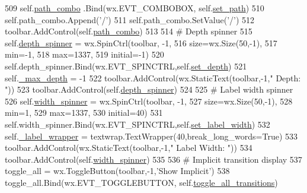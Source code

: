 \begin{DoxyCode}
509         self.\hyperlink{classsmacc__viewer_1_1SmaccViewerFrame_a2b2ee042e4a0d11372e1d12c1925a286}{path\_combo} .Bind(wx.EVT\_COMBOBOX, self.\hyperlink{classsmacc__viewer_1_1SmaccViewerFrame_a4b253c9dc94a475f795644f8a10301c3}{set\_path})
510         self.path\_combo.Append(\textcolor{stringliteral}{'/'})
511         self.path\_combo.SetValue(\textcolor{stringliteral}{'/'})
512         toolbar.AddControl(self.\hyperlink{classsmacc__viewer_1_1SmaccViewerFrame_a2b2ee042e4a0d11372e1d12c1925a286}{path\_combo})
513 
514         \textcolor{comment}{# Depth spinner}
515         self.\hyperlink{classsmacc__viewer_1_1SmaccViewerFrame_abb2756c3503845a85a64c99a7479af63}{depth\_spinner} = wx.SpinCtrl(toolbar, -1,
516                 size=wx.Size(50,-1),
517                 min=-1,
518                 max=1337,
519                 initial=-1)
520         self.depth\_spinner.Bind(wx.EVT\_SPINCTRL,self.\hyperlink{classsmacc__viewer_1_1SmaccViewerFrame_abef01aa41e1f8fe1c74ee942ec44d7ea}{set\_depth})
521         self.\hyperlink{classsmacc__viewer_1_1SmaccViewerFrame_acf8a98a2a2d4ae1f21e0fc3cd020b89a}{\_max\_depth} = -1
522         toolbar.AddControl(wx.StaticText(toolbar,-1,\textcolor{stringliteral}{"    Depth: "}))
523         toolbar.AddControl(self.\hyperlink{classsmacc__viewer_1_1SmaccViewerFrame_abb2756c3503845a85a64c99a7479af63}{depth\_spinner})
524 
525         \textcolor{comment}{# Label width spinner}
526         self.\hyperlink{classsmacc__viewer_1_1SmaccViewerFrame_a9e092051eb4c76d6721dcea6c5c48cde}{width\_spinner} = wx.SpinCtrl(toolbar, -1,
527                 size=wx.Size(50,-1),
528                 min=1,
529                 max=1337,
530                 initial=40)
531         self.width\_spinner.Bind(wx.EVT\_SPINCTRL,self.\hyperlink{classsmacc__viewer_1_1SmaccViewerFrame_afa97fe84879ff60867cc61a80f9fb6f7}{set\_label\_width})
532         self.\hyperlink{classsmacc__viewer_1_1SmaccViewerFrame_a839af1f1021fa7e47ccdfd63d2c56406}{\_label\_wrapper} = textwrap.TextWrapper(40,break\_long\_words=\textcolor{keyword}{True})
533         toolbar.AddControl(wx.StaticText(toolbar,-1,\textcolor{stringliteral}{"    Label Width: "}))
534         toolbar.AddControl(self.\hyperlink{classsmacc__viewer_1_1SmaccViewerFrame_a9e092051eb4c76d6721dcea6c5c48cde}{width\_spinner})
535 
536         \textcolor{comment}{# Implicit transition display}
537         toggle\_all = wx.ToggleButton(toolbar,-1,\textcolor{stringliteral}{'Show Implicit'})
538         toggle\_all.Bind(wx.EVT\_TOGGLEBUTTON, self.\hyperlink{classsmacc__viewer_1_1SmaccViewerFrame_a4c7e69bdb63f74477ed779d79007f335}{toggle\_all\_transitions})

\end{DoxyCode}
